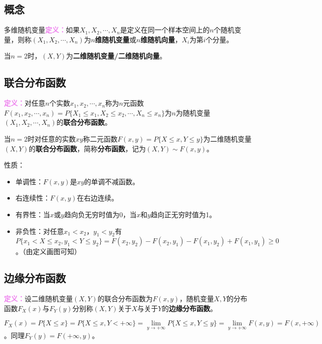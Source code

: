 \documentclass[UTF8, 12pt]{ctexart}
\begin{document}
\subsection{概念}

多维随机变量\textcolor{violet}{\textbf{定义：}}如果$X_1,X_2,\cdots,X_n$是定义在同一个样本空间上的$n$个随机变量，则称$(X_1,X_2,\cdots,X_n)$为\textbf{$n$维随机变量}或\textbf{$n$维随机向量}，$X_i$为第$i$个分量。

当$n=2$时，$(X,Y)$为\textbf{二维随机变量/二维随机向量}。

\subsection{联合分布函数}

\textcolor{violet}{\textbf{定义：}}对任意$n$个实数$x_1,x_2,\cdots,x_n$称为$n$元函数$F(x_1,x_2,\cdots,x_n)=P\{X_1\leqslant x_1,X_2\leqslant x_2,\cdots,X_n\leqslant x_n\}$为$n$为随机变量$(X_1,X_2,\cdots,X_n)$的\textbf{联合分布函数}。

当$n=2$时对任意的实数$xy$称二元函数$F(x,y)=P\{X\leqslant x,Y\leqslant y\}$为二维随机变量$(X,Y)$的\textbf{联合分布函数}，简称\textbf{分布函数}，记为$(X,Y)\sim F(x,y)$。

性质：

\begin{itemize}
    \item 单调性：$F(x,y)$是$xy$的单调不减函数。
    \item 右连续性：$F(x,y)$在右边连续。
    \item 有界性：当$x$或$y$趋向负无穷时值为0，当$x$和$y$趋向正无穷时值为1。
    \item 非负性：对任意$x_1<x_2$，$y_1<y_2$有$P\{x_1<X\leqslant x_2,y_1<Y\leqslant y_2\}=F(x_2,y_2)-F(x_2,y_1)-F(x_1,y_2)+F(x_1,y_1)\geqslant0$。（由定义画图可知）
\end{itemize}

\subsection{边缘分布函数}

\textcolor{violet}{\textbf{定义：}}设二维随机变量$(X,Y)$的联合分布函数为$F(x,y)$，随机变量$X,Y$的分布函数$F_X(x)$与$F_Y(y)$分别称$(X,Y)$关于$X$与关于$Y$的\textbf{边缘分布函数}。

$F_X(x)=P\{X\leqslant x\}=P\{X\leqslant x,Y<+\infty\}=\lim\limits_{y\to+\infty}P\{X\leqslant x,Y\leqslant y\}=\lim\limits_{y\to+\infty}F(x,y)=F(x,+\infty)$。同理$F_Y(y)=F(+\infty,y)$。
\end{document}
